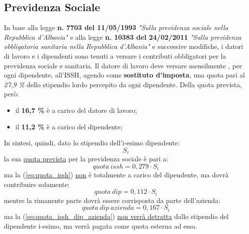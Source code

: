 \subsection[Previdenza Sociale]{Previdenza Sociale}
\label{sec:previdenza_sociale_albania}
In base alla legge \textbf{n. 7703 del 11/05/1993} \textit{"Sulla previdenza sociale nella Repubblica d'Albania"} e alla legge \textbf{n. 10383 del 24/02/2011} \textit{"Sulla previdenza obbligatoria sanitaria nella Repubblica d'Albania"} e successive modifiche, i datori di lavoro e i dipendenti sono tenuti a versare i contributi obbligatori per la previdenza sociale e sanitaria. \newline
Il datore di lavoro deve versare mensilmente , per ogni dipendente, all'\ac{ISSH}, agendo come \textbf{sostituto d'imposta}, una quota pari al \textit{27,9 \%} dello stipendio lordo percepito da ogni dipendente.
Della quota prevista, però:
\begin{itemize}
\item il \textbf{16,7 \%} è a carico del datore di lavoro;
\item il \textbf{11,2 \%} è a carico del dipendente;
\end{itemize}
In sintesi, quindi, dato lo stipendio dell'i-esimo dipendente:
\begin{equation}
\label{eq:stipendio_dip}
S_i
\end{equation}
la sua \underline{quota prevista} per la previdenza sociale è pari a:
\begin{equation}
\label{eq:quota_issh}
quota \: issh = 0,279 \cdot S_i
\end{equation}
ma la (\ref{eq:quota_issh}) \underline{non} è totalmente a carico del dipendente, ma dovrà contribuire solamente:
\begin{equation}
\label{eq:quota_issh_dip}
quota \: dip = 0,112 \cdot S_i
\end{equation}
mentre la rimanente parte dovrà essere corrisposta da parte dell'azienda:
\begin{equation}
\label{eq:quota_issh_dip_azienda}
quota \: dip \:azienda = 0,167 \cdot S_i
\end{equation}
ma la (\ref{eq:quota_issh_dip_azienda}) \underline{non verrà detratta} dallo stipendio del dipendente i-esimo, ma verrà pagata come quota esterna ad esso.

